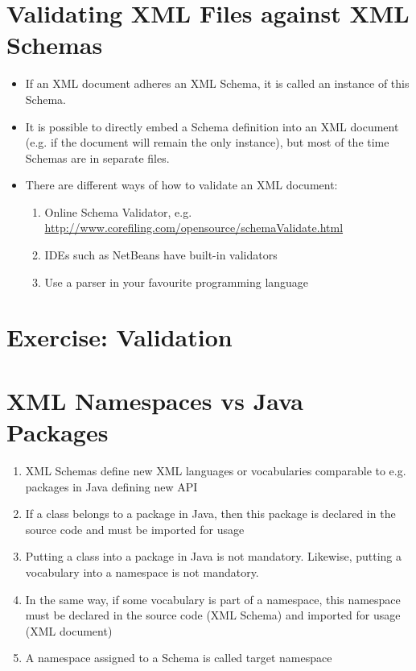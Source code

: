 \section{Validating XML Files against XML Schemas}
\begin{itemize}
\item If an XML document adheres an XML Schema, it is called an instance of this Schema.
\item It is possible to directly embed a Schema definition into an XML document (e.g. if the document will remain the only instance), but most of the time Schemas are in separate files.
\item There are different ways of how to validate an XML document:
\begin{enumerate}
\item Online Schema Validator, e.g. \href{http://www.corefiling.com/opensource/schemaValidate.html}{http://www.corefiling.com/opensource/schemaValidate.html} 
\item IDEs such as NetBeans have built-in validators
\item Use a parser in your favourite programming language
\end{enumerate}
\end{itemize}

\section{Exercise: Validation}

\section{XML Namespaces vs Java Packages}
\begin{enumerate}
\item XML Schemas define new XML languages or vocabularies comparable to e.g. packages in Java defining new API
\item If a class belongs to a package in Java, then this package is declared in the source code and must be imported for usage
\item Putting a class into a package in Java is not mandatory.
Likewise, putting a vocabulary into a namespace is not mandatory.
\item In the same way, if some vocabulary is part of a namespace, this namespace must be declared in the source code (XML Schema) and imported for usage (XML document)
\item A namespace assigned to a Schema is called target namespace
\end{enumerate}

